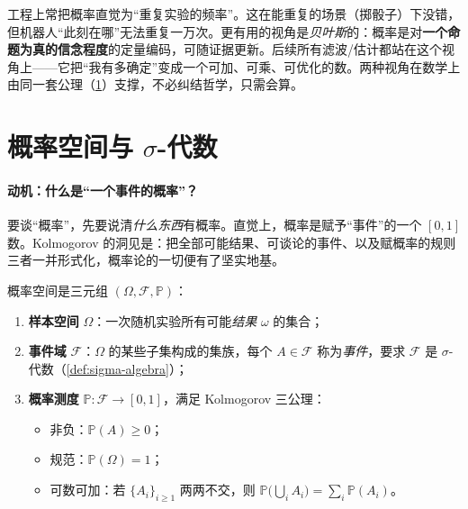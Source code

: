 \begin{insight}
工程上常把概率直觉为“重复实验的频率”。这在能重复的场景（掷骰子）下没错，但机器人“此刻在哪”无法重复一万次。更有用的视角是\emph{贝叶斯}的：概率是对\textbf{一个命题为真的信念程度}的定量编码，可随证据更新。后续所有滤波/估计都站在这个视角上——它把“我有多确定”变成一个可加、可乘、可优化的数。两种视角在数学上由同一套公理（\cref{sec:prob-space}）支撑，不必纠结哲学，只需会算。
\end{insight}

\section{概率空间与 \texorpdfstring{$\sigma$}{sigma}-代数}
\label{sec:prob-space}

\paragraph{动机：什么是“一个事件的概率”？}
要谈“概率”，先要说清\emph{什么东西}有概率。直觉上，概率是赋予“事件”的一个 $[0,1]$ 数。Kolmogorov 的洞见是：把全部可能结果、可谈论的事件、以及赋概率的规则三者一并形式化，概率论的一切便有了坚实地基。

\begin{definition}[概率空间]\label{def:prob-space}
概率空间是三元组 $(\Omega,\mathcal{F},\mathbb{P})$：
\begin{enumerate}
  \item \textbf{样本空间} $\Omega$：一次随机实验所有可能\emph{结果} $\omega$ 的集合；
  \item \textbf{事件域} $\mathcal{F}$：$\Omega$ 的某些子集构成的集族，每个 $A\in\mathcal{F}$ 称为\emph{事件}，要求 $\mathcal{F}$ 是 $\sigma$-代数（\cref{def:sigma-algebra}）；
  \item \textbf{概率测度} $\mathbb{P}:\mathcal{F}\to[0,1]$，满足 Kolmogorov 三公理：
  \begin{itemize}
    \item 非负：$\mathbb{P}(A)\ge0$；
    \item 规范：$\mathbb{P}(\Omega)=1$；
    \item 可数可加：若 $\{A_i\}_{i\ge1}$ 两两不交，则 $\mathbb{P}\big(\bigcup_i A_i\big)=\sum_i\mathbb{P}(A_i)$。
  \end{itemize}
\end{enumerate}
\end{definition}


